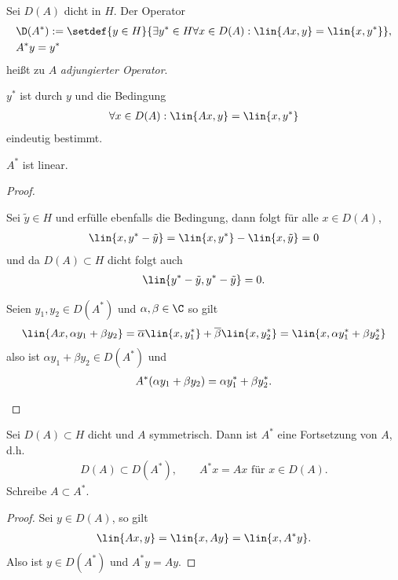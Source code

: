 \begin{defn}
\label{defn:8.5}
Sei $D(A)$ dicht in $H$. Der Operator
\begin{align*}
&\D(A^*) := \setdef{y\in H}{\exists y^*\in H \forall x\in D(A) : \lin{Ax,y} =
\lin{x,y^*}},\\
&A^* y = y^*
\end{align*}
heißt zu $A$ \emph{adjungierter Operator}.\fishhere
\end{defn}

\begin{prop}
\label{prop:8.6}
\begin{propenum}
\item $y^*$ ist durch $y$ und die Bedingung
\begin{align*}
\forall x\in D(A) : \lin{Ax,y} = \lin{x,y^*}
\end{align*}
eindeutig bestimmt.
\item $A^*$ ist linear.\fishhere
\end{propenum}
\end{prop}
\begin{proof}
\begin{proofenum}
\item Sei $\tilde{y}\in H$ und erfülle ebenfalls die Bedingung, dann folgt für
alle $x\in D(A)$,
\begin{align*}
\lin{x,y^*-\tilde{y}} = \lin{x,y^*}-\lin{x,\tilde{y}} = 0
\end{align*}
und da $D(A)\subset H$ dicht folgt auch
\begin{align*}
\lin{y^*-\tilde{y},y^*-\tilde{y}} = 0.
\end{align*}
\item Seien $y_1,y_2\in D(A^*)$ und $\alpha,\beta\in\C$ so gilt
\begin{align*}
\lin{Ax,\alpha y_1 + \beta y_2} = \overline{\alpha}\lin{x,y_1^*} +
\overline{\beta}\lin{x,y_2^*} = \lin{x,\alpha y_1^* + \beta y_2^*}
\end{align*}
also ist $\alpha y_1 + \beta y_2\in D(A^*)$ und
\begin{align*}
A^*(\alpha y_1 + \beta y_2)= \alpha y_1^* + \beta y_2^*.\qedhere
\end{align*}
\end{proofenum}
\end{proof}

\begin{prop}
\label{prop:8.7}
Sei $D(A)\subset H$ dicht und $A$ symmetrisch. Dann ist $A^*$ eine Fortsetzung
von $A$, d.h.
\begin{align*}
D(A)\subset D(A^*),\qquad A^*x = Ax\text{ für }x\in D(A).
\end{align*}
Schreibe $A\subset A^*$.\fishhere
\end{prop}
\begin{proof}
Sei $y\in D(A)$, so gilt
\begin{align*}
\lin{Ax,y} = \lin{x,Ay} = \lin{x,A^*y}.
\end{align*}
Also ist $y\in D(A^*)$ und $A^*y = Ay$.\qedhere
\end{proof}

